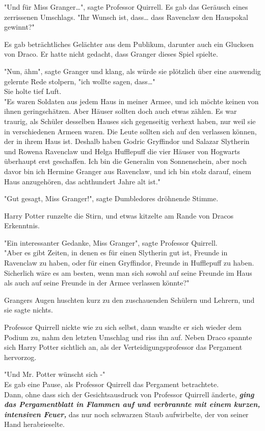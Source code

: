 {"Und für Miss Granger…", sagte Professor Quirrell. Es gab das Geräusch eines zerrissenen Umschlags. "Ihr Wunsch ist, dass… dass Ravenclaw den Hauspokal gewinnt?"

Es gab beträchtliches Gelächter aus dem Publikum, darunter auch ein Glucksen von Draco. Er hatte nicht gedacht, dass Granger dieses Spiel spielte.

"Nun, ähm", sagte Granger und klang, als würde sie plötzlich über eine auswendig gelernte Rede stolpern, "ich wollte sagen, dass…"\\ Sie holte tief Luft.\\ "Es waren Soldaten aus jedem Haus in meiner Armee, und ich möchte keinen von ihnen geringschätzen. Aber Häuser sollten doch auch etwas zählen. Es war traurig, als Schüler desselben Hauses sich gegenseitig verhext haben, nur weil sie in verschiedenen Armeen waren. Die Leute sollten sich auf den verlassen können, der in ihrem Haus ist. Deshalb haben Godric Gryffindor und Salazar Slytherin und Rowena Ravenclaw und Helga Hufflepuff die vier Häuser von Hogwarts überhaupt erst geschaffen. Ich bin die Generalin von Sonnenschein, aber noch davor bin ich Hermine Granger aus Ravenclaw, und ich bin stolz darauf, einem Haus anzugehören, das achthundert Jahre alt ist."

"Gut gesagt, Miss Granger!", sagte Dumbledores dröhnende Stimme.

Harry Potter runzelte die Stirn, und etwas kitzelte am Rande von Dracos Erkenntnis.

"Ein interessanter Gedanke, Miss Granger", sagte Professor Quirrell.\\ "Aber es gibt Zeiten, in denen es für einen Slytherin gut ist, Freunde in Ravenclaw zu haben, oder für einen Gryffindor, Freunde in Hufflepuff zu haben. Sicherlich wäre es am besten, wenn man sich sowohl auf seine Freunde im Haus als auch auf seine Freunde in der Armee verlassen könnte?"

Grangers Augen huschten kurz zu den zuschauenden Schülern und Lehrern, und sie sagte nichts.

Professor Quirrell nickte wie zu sich selbst, dann wandte er sich wieder dem Podium zu, nahm den letzten Umschlag und riss ihn auf. Neben Draco spannte sich Harry Potter sichtlich an, als der Verteidigungsprofessor das Pergament hervorzog.

"Und Mr. Potter wünscht sich -"\\ Es gab eine Pause, als Professor Quirrell das Pergament betrachtete.\\ Dann, ohne dass sich der Gesichtsausdruck von Professor Quirrell änderte, \textbf{\emph{ging das Pergamentblatt in Flammen auf und verbrannte mit einem kurzen, intensiven Feuer,}} das nur noch schwarzen Staub aufwirbelte, der von seiner Hand herabrieselte.

}
